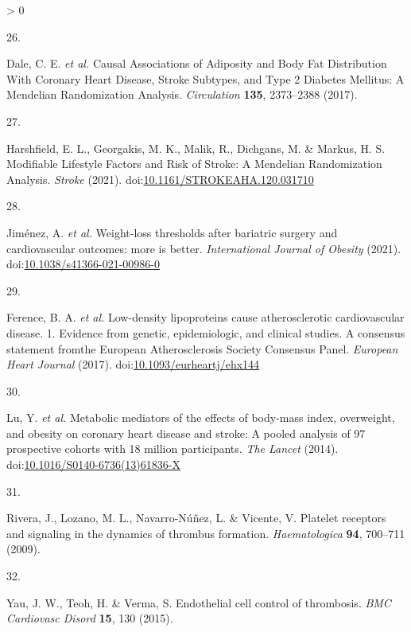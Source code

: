 \documentclass[11pt,twoside]{bristolthesis}
\newlength{\cslhangindent}
\newlength{\csllabelwidth}
\newenvironment{CSLReferences}[2] %
 {%
  \setlength{\parindent}{0pt}
  \ifodd #1 \everypar{\setlength{\hangindent}{\cslhangindent}}\ignorespaces\fi
  \ifnum #2 > 0
  \setlength{\parskip}{#2\baselineskip}
  \fi
 }%
 {}
\newcommand{\CSLLeftMargin}[1]{\parbox[t]{\csllabelwidth}{#1}}
\newcommand{\CSLRightInline}[1]{\parbox[t]{\linewidth - \csllabelwidth}{#1}\break}
\begin{document}
\begin{CSLReferences}{0}{0}
\leavevmode\hypertarget{ref-Dale2017}{}%
\CSLLeftMargin{26. }
\CSLRightInline{Dale, C. E. \emph{et al.} {Causal Associations of Adiposity and Body Fat Distribution With Coronary Heart Disease, Stroke Subtypes, and Type 2 Diabetes Mellitus: A Mendelian Randomization Analysis}. \emph{Circulation} \textbf{135}, 2373--2388 (2017).}

\leavevmode\hypertarget{ref-Harshfield2021}{}%
\CSLLeftMargin{27. }
\CSLRightInline{Harshfield, E. L., Georgakis, M. K., Malik, R., Dichgans, M. \& Markus, H. S. {Modifiable Lifestyle Factors and Risk of Stroke: A Mendelian Randomization Analysis}. \emph{Stroke} (2021). doi:\href{https://doi.org/10.1161/STROKEAHA.120.031710}{10.1161/STROKEAHA.120.031710}}

\leavevmode\hypertarget{ref-Jimenez2021}{}%
\CSLLeftMargin{28. }
\CSLRightInline{Jiménez, A. \emph{et al.} {Weight-loss thresholds after bariatric surgery and cardiovascular outcomes: more is better}. \emph{International Journal of Obesity} (2021). doi:\href{https://doi.org/10.1038/s41366-021-00986-0}{10.1038/s41366-021-00986-0}}

\leavevmode\hypertarget{ref-Ference2017}{}%
\CSLLeftMargin{29. }
\CSLRightInline{Ference, B. A. \emph{et al.} {Low-density lipoproteins cause atherosclerotic cardiovascular disease. 1. Evidence from genetic, epidemiologic, and clinical studies. A consensus statement fromthe European Atherosclerosis Society Consensus Panel}. \emph{European Heart Journal} (2017). doi:\href{https://doi.org/10.1093/eurheartj/ehx144}{10.1093/eurheartj/ehx144}}

\leavevmode\hypertarget{ref-Lu2014}{}%
\CSLLeftMargin{30. }
\CSLRightInline{Lu, Y. \emph{et al.} {Metabolic mediators of the effects of body-mass index, overweight, and obesity on coronary heart disease and stroke: A pooled analysis of 97 prospective cohorts with 1{{}}8 million participants}. \emph{The Lancet} (2014). doi:\href{https://doi.org/10.1016/S0140-6736(13)61836-X}{10.1016/S0140-6736(13)61836-X}}

\leavevmode\hypertarget{ref-Rivera2009}{}%
\CSLLeftMargin{31. }
\CSLRightInline{Rivera, J., Lozano, M. L., Navarro-Núñez, L. \& Vicente, V. {Platelet receptors and signaling in the dynamics of thrombus formation}. \emph{Haematologica} \textbf{94}, 700--711 (2009).}

\leavevmode\hypertarget{ref-Yau2015}{}%
\CSLLeftMargin{32. }
\CSLRightInline{Yau, J. W., Teoh, H. \& Verma, S. {Endothelial cell control of thrombosis}. \emph{BMC Cardiovasc Disord} \textbf{15}, 130 (2015).}


\end{CSLReferences}
\end{document}
